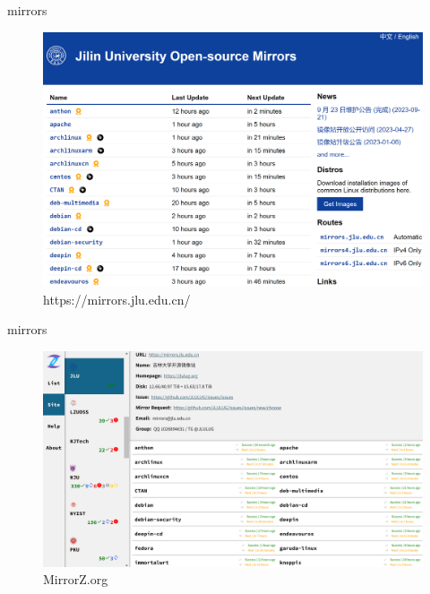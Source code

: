 \documentclass{beamer}
\begin{document}
\begin{frame}{mirrors}
    \begin{figure}[c]
        \centering
        \includegraphics[height=.8\textheight]{pic/mirror.png}
        \caption{https://mirrors.jlu.edu.cn/}
    \end{figure}
\end{frame}

\begin{frame}{mirrors}
    \begin{figure}[c]
        \centering
        \includegraphics[height=.7\textheight]{pic/mirrorz.png}
        \caption{MirrorZ.org}
    \end{figure}
\end{frame}
\end{document}
